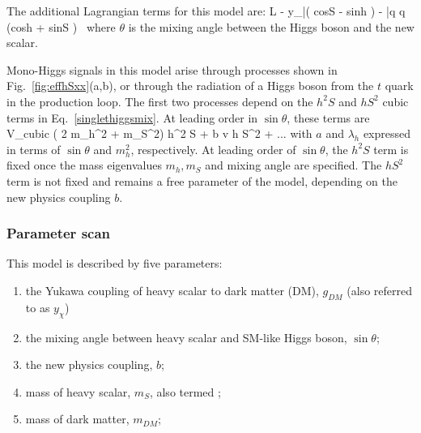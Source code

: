 The additional Lagrangian terms for this model are: 
\be \label{LintScalar2}
L \supset - y_\chi \bar\chi \chi (  cos\theta S - sin\theta h ) -  \bar q q (cos\theta h + sin\theta S )  \,
\ee
where $\theta$ is the mixing angle between the Higgs boson and the new scalar. 

Mono-Higgs signals in this model arise through processes shown in Fig.~\ref{fig:effhSxx}(a,b), or through 
the radiation of a Higgs boson from the  $t$ quark in the production loop. The first two processes
depend on the $h^2 S$ and $h S^2$ cubic terms in Eq.~\eqref{singlethiggsmix}.  
At leading order in $\sin\theta$, these terms are
\be
V_{\rm cubic} \approx {} ( 2 m_h^2 + m_S^2) h^2 S  + b v h S^2 + ...
\ee
with $a$ and $\lambda_h$ expressed in terms of $\sin\theta$ and $m_h^2$, respectively.  
At leading order of $\sin\theta$, the $h^2 S$ term is fixed once the mass eigenvalues $m_h, m_S$ 
and mixing angle are specified.  The $h S^2$ term is not fixed and remains a free parameter of the model, depending on 
the new physics coupling $b$. 

\subsubsection{Parameter scan}

This model is described by five parameters: 

\begin{enumerate}
	\item the Yukawa coupling of heavy scalar to dark matter (DM), $g_{DM}$ (also referred to as $y_\chi$) 
	\item the mixing angle between heavy scalar and SM-like Higgs boson, $\sin\theta$;
	\item the new physics coupling, $b$;
	\item mass of heavy scalar, $m_{S}$, also termed \mmed;
	\item mass of dark matter, $m_{DM}$;
\end{enumerate}

